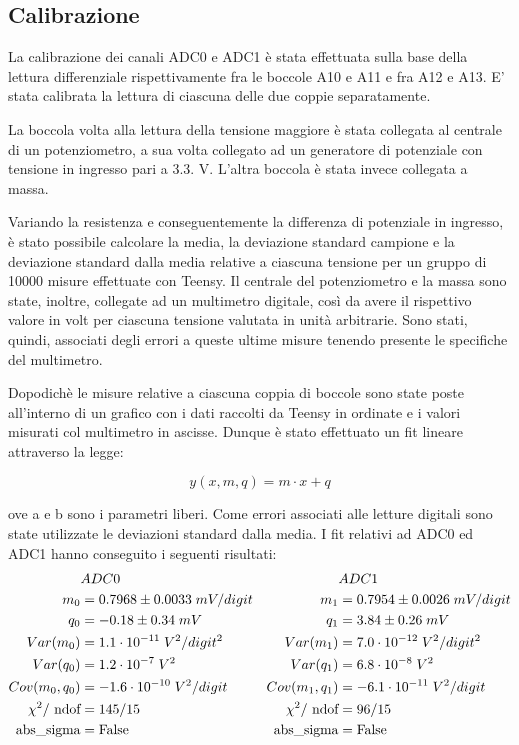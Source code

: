 \documentclass{article}[a4paper, oneside, 11pt]
\begin{document}
\subsection{Calibrazione}

La calibrazione dei canali ADC0 e ADC1 è stata effettuata sulla base della lettura differenziale rispettivamente fra le boccole A10 e A11 e fra A12 e A13. E’ stata calibrata la lettura di ciascuna delle due coppie separatamente.

La boccola volta alla lettura della tensione maggiore è stata collegata al centrale di un potenziometro, a sua volta collegato ad un generatore di potenziale con tensione in ingresso pari a 3.3. V. L’altra boccola è stata invece collegata a massa.

Variando la resistenza e conseguentemente la differenza di potenziale in ingresso, è stato possibile calcolare la media, la deviazione standard campione e la deviazione standard dalla media  relative a ciascuna tensione per un gruppo di 10000 misure effettuate con Teensy. Il centrale del potenziometro e la massa sono state, inoltre, collegate ad un multimetro digitale, così da avere il rispettivo valore in volt per ciascuna tensione valutata in unità arbitrarie. Sono stati, quindi, associati degli errori a queste ultime misure  tenendo presente le specifiche del multimetro.

Dopodichè le misure relative a ciascuna coppia di boccole sono state poste all’interno di un grafico con i dati raccolti da Teensy in ordinate e i valori misurati col multimetro in ascisse. Dunque è stato effettuato un fit lineare attraverso la legge:

\begin{equation}
y(x, m, q)  = m \cdot x + q
\end{equation}

ove a e b sono i parametri liberi. Come errori associati alle letture digitali sono state utilizzate le deviazioni standard dalla media. I fit relativi ad ADC0 ed ADC1 hanno conseguito i seguenti risultati:
\begin{align*}
	&ADC0	&&ADC1\\
	m_0 &= 0.7968 \pm  0.0033   \; mV/digit	& m_1 &= 0.7954 \pm 0.0026  \; mV/digit \\
	q_0 &= - 0.18 \pm 0.34  \; mV 	&q_1 &= 3.84  \pm 0.26  \; mV \\
	Var(m_0)  &= 1.1 \cdot 10^{-11}  \; V^2 /digit^2	&Var(m_1) &= 7.0 \cdot 10^{-12}  \; V^2 /digit^2 \\
	Var(q_0) &=1.2 \cdot 10^{-7} \; V^2 	&Var(q_1) &= 6.8 \cdot 10^{-8} \; V^2 \\
	Cov(m_0, q_0) &= - 1.6 \cdot 10^{-10} \; V^2  /digit	&Cov(m_1, q_1) &= - 6.1 \cdot 10^{-11} \; V^2  /digit \\
	{\chi}^2/\text{ ndof} &= {145 }/{15}	&{\chi}^2/\text{ ndof} &= {96}/{15}\\ 
	\text{abs\_sigma} &= \rm False	&\text{abs\_sigma} &= \rm False
\end{align*}
\end{document}
